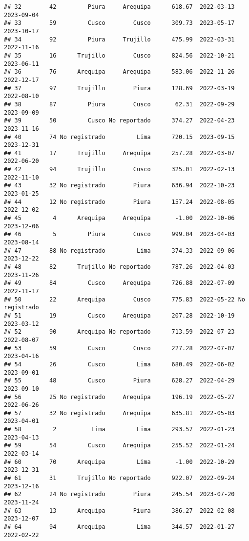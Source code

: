 \documentclass[
]{article}
\begin{document}
\begin{verbatim}
## 32        42         Piura     Arequipa      618.67  2022-03-13    2023-09-04
## 33        59         Cusco        Cusco      309.73  2023-05-17    2023-10-17
## 34        92         Piura     Trujillo      475.99  2022-03-31    2022-11-16
## 35        16      Trujillo        Cusco      824.56  2022-10-21    2023-06-11
## 36        76      Arequipa     Arequipa      583.06  2022-11-26    2022-12-17
## 37        97      Trujillo        Piura      128.69  2022-03-19    2022-08-10
## 38        87         Piura        Cusco       62.31  2022-09-29    2023-09-09
## 39        50         Cusco No reportado      374.27  2022-04-23    2023-11-16
## 40        74 No registrado         Lima      720.15  2023-09-15    2023-12-31
## 41        17      Trujillo     Arequipa      257.28  2022-03-07    2022-06-20
## 42        94      Trujillo        Cusco      325.01  2022-02-13    2022-11-10
## 43        32 No registrado        Piura      636.94  2022-10-23    2023-01-25
## 44        12 No registrado        Piura      157.24  2022-08-05    2022-12-02
## 45         4      Arequipa     Arequipa       -1.00  2022-10-06    2023-12-06
## 46         5         Piura        Cusco      999.04  2023-04-03    2023-08-14
## 47        88 No registrado         Lima      374.33  2022-09-06    2023-12-22
## 48        82      Trujillo No reportado      787.26  2022-04-03    2023-11-26
## 49        84         Cusco     Arequipa      726.88  2022-07-09    2022-11-17
## 50        22      Arequipa        Cusco      775.83  2022-05-22 No registrado
## 51        19         Cusco     Arequipa      207.28  2022-10-19    2023-03-12
## 52        90      Arequipa No reportado      713.59  2022-07-23    2022-08-07
## 53        59         Cusco        Cusco      227.28  2022-07-07    2023-04-16
## 54        26         Cusco         Lima      680.49  2022-06-02    2023-09-01
## 55        48         Cusco        Piura      628.27  2022-04-29    2023-09-10
## 56        25 No registrado     Arequipa      196.19  2022-05-27    2022-06-26
## 57        32 No registrado     Arequipa      635.81  2022-05-03    2023-04-01
## 58         2          Lima         Lima      293.57  2022-01-23    2023-04-13
## 59        54         Cusco     Arequipa      255.52  2022-01-24    2022-03-14
## 60        70      Arequipa         Lima       -1.00  2022-10-29    2023-12-31
## 61        31      Trujillo No reportado      922.07  2022-09-24    2023-12-16
## 62        24 No registrado        Piura      245.54  2023-07-20    2023-11-24
## 63        13      Arequipa        Piura      386.27  2022-02-08    2023-12-07
## 64        94      Arequipa         Lima      344.57  2022-01-27    2022-02-22

\end{verbatim}
\end{document}
